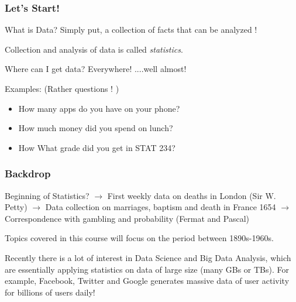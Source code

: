 \documentclass{beamer}\usepackage[]{graphicx}\usepackage[]{color}
\begin{document}
\begin{frame}[fragile]
\frametitle{Let's Start!}

What is Data? \pause\newline
Simply put, a collection of facts that can be analyzed !  
\newline \pause

Collection and analysis of data is called \textit{statistics}. \pause \newline

Where can I get data?\pause\newline
Everywhere! ....well almost!
\newline\pause 
 

Examples:  \pause (Rather questions ! )
\pause
\begin{itemize}
\item How many apps do you have on your phone? \pause
\item How much money did you spend on lunch? \pause 
\item How What grade did you get in STAT 234? \pause
\end{itemize}

\end{frame}

\begin{frame}[fragile]
\frametitle{Backdrop}

Beginning of Statistics? \pause{} $\rightarrow$ First weekly data on deaths in London (Sir W. Petty)  $\rightarrow$ Data collection on marriages, baptism and death in France
1654 $\rightarrow$ Correspondence with gambling and probability (Fermat and Pascal)
\newline \pause

Topics covered in this course will focus on the period between 1890s-1960s.
\newline \pause 

Recently there is a lot of interest in Data Science and Big Data Analysis, which
are essentially applying statistics on data of large size (many GBs or TBs). For example, Facebook, Twitter and Google generates massive data of user activity 
for billions of users daily!

\end{frame}
\end{document}
